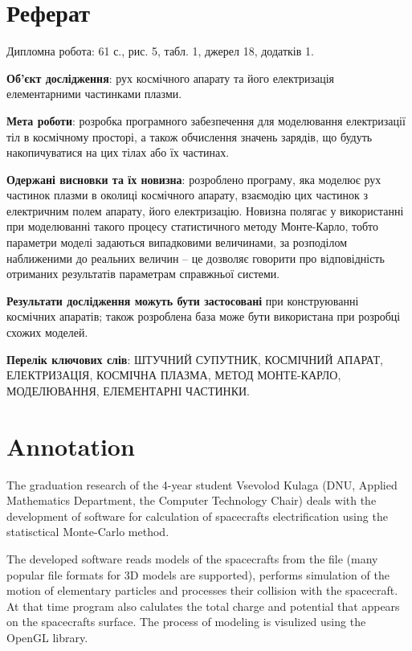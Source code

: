 \documentclass[a4paper,12pt]{article}
\begin{document}
\onehalfspacing
\large

\setcounter{page}{2}

\section*{Реферат}
Дипломна робота: 61 с., рис. 5, табл. 1, джерел 18, додатків 1.

\textbf{Об’єкт дослідження}: рух космічного апарату та його електризація елементарними частинками плазми.

\textbf{Мета роботи}: розробка програмного забезпечення для моделювання електризації тіл в космічному просторі, а також обчислення значень зарядів, що будуть накопичуватися на цих тілах або їх частинах.

\textbf{Одержані висновки та їх новизна}: розроблено програму, яка моделює рух частинок плазми в околиці космічного апарату, взаємодію цих частинок з електричним полем апарату, його електризацію. Новизна полягає у використанні при моделюванні такого процесу статистичного методу Монте-Карло, тобто параметри моделі задаються випадковими величинами, за розподілом наближеними до реальних величин -- це дозволяє говорити про відповідність отриманих результатів параметрам справжньої системи.

\textbf{Результати дослідження можуть бути застосовані} при конструюванні космічних апаратів; також розроблена база може бути використана при розробці схожих моделей.

\textbf{Перелік ключових слів}: ШТУЧНИЙ СУПУТНИК, КОСМІЧНИЙ АПАРАТ, ЕЛЕКТРИЗАЦІЯ, КОСМІЧНА ПЛАЗМА, МЕТОД МОНТЕ-КАРЛО, МОДЕЛЮВАННЯ, ЕЛЕМЕНТАРНІ ЧАСТИНКИ.

\newpage

\section*{Annotation}

The graduation research of the 4-year student Vsevolod Kulaga (DNU, Applied Mathematics Department, the Computer Technology Chair) deals with the development of software for calculation of spacecrafts electrification using the statisctical Monte-Carlo method.
 
The developed software reads models of the spacecrafts from the file (many popular file formats for 3D models are supported), performs simulation of the motion of elementary particles and processes their collision with the spacecraft. At that time program also calulates the total charge and potential that appears on the spacecrafts surface. The process of modeling is visulized using the OpenGL library.
\end{document}
